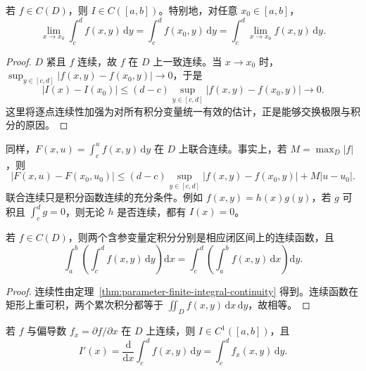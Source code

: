 \documentclass[UTF8,12pt,a4paper,fontset=fandol]{ctexbook}
\begin{document}
\begin{theorem}[连续性与极限交换]
\label{thm:parameter-finite-integral-continuity}
若 $f\in C(D)$，则 $I\in C([a,b])$。特别地，对任意 $x_0\in[a,b]$，
\begin{equation}
    \lim_{x\to x_0}\int_c^d f(x,y)\,\mathrm{d}y
    =\int_c^d f(x_0,y)\,\mathrm{d}y
    =\int_c^d\lim_{x\to x_0}f(x,y)\,\mathrm{d}y.
    \label{eq:parameter-finite-limit-exchange}
\end{equation}
\end{theorem}

\begin{proof}
$D$ 紧且 $f$ 连续，故 $f$ 在 $D$ 上一致连续。当 $x\to x_0$ 时，$\sup_{y\in[c,d]}|f(x,y)-f(x_0,y)|\to0$，于是
\[
    |I(x)-I(x_0)|\leq(d-c)
    \sup_{y\in[c,d]}|f(x,y)-f(x_0,y)|\longrightarrow0.
\]
这里将逐点连续性加强为对所有积分变量统一有效的估计，正是能够交换极限与积分的原因。
\end{proof}

同样，$F(x,u)=\int_c^u f(x,y)\,\mathrm{d}y$ 在 $D$ 上联合连续。事实上，若 $M=\max_D|f|$，则
\[
    |F(x,u)-F(x_0,u_0)|
    \leq(d-c)\sup_{y\in[c,d]}|f(x,y)-f(x_0,y)|+M|u-u_0|.
\]
联合连续只是积分函数连续的充分条件。例如 $f(x,y)=h(x)g(y)$，若 $g$ 可积且 $\int_c^d g=0$，则无论 $h$ 是否连续，都有 $I(x)=0$。

\begin{theorem}[积分次序交换]
\label{thm:parameter-finite-integration-exchange}
若 $f\in C(D)$，则两个含参变量定积分分别是相应闭区间上的连续函数，且
\begin{equation}
    \int_a^b\left(\int_c^d f(x,y)\,\mathrm{d}y\right)\mathrm{d}x
    =\int_c^d\left(\int_a^b f(x,y)\,\mathrm{d}x\right)\mathrm{d}y.
    \label{eq:parameter-finite-integration-exchange}
\end{equation}
\end{theorem}

\begin{proof}
连续性由定理~\ref{thm:parameter-finite-integral-continuity} 得到。连续函数在矩形上重可积，两个累次积分都等于 $\iint_D f(x,y)\,\mathrm{d}x\,\mathrm{d}y$，故相等。
\end{proof}

\begin{theorem}[积分号下求导]
\label{thm:parameter-finite-differentiation}
若 $f$ 与偏导数 $f_x=\partial f/\partial x$ 在 $D$ 上连续，则 $I\in C^1([a,b])$，且
\begin{equation}
    I'(x)=\frac{\mathrm{d}}{\mathrm{d}x}\int_c^d f(x,y)\,\mathrm{d}y
    =\int_c^d f_x(x,y)\,\mathrm{d}y.
    \label{eq:parameter-finite-differentiation}
\end{equation}
\end{theorem}
\end{document}
